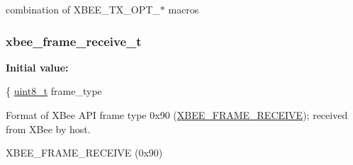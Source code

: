 combination of X\-B\-E\-E\-\_\-\-T\-X\-\_\-\-O\-P\-T\-\_\-$\ast$ macros \hypertarget{group__xbee__wpan_ga0d1e37574952bdf60cda7f1351b41a9e}{
\subsubsection[{xbee\-\_\-frame\-\_\-receive\-\_\-t}]{\setlength{\rightskip}{0pt plus 5cm}xbee\-\_\-frame\-\_\-receive\-\_\-t}}\label{group__xbee__wpan_ga0d1e37574952bdf60cda7f1351b41a9e}
{\bfseries Initial value\-:}
\begin{DoxyCode}
\{
   \hyperlink{group__hal_gae1affc9ca37cfb624959c866a73f83c2}{uint8\_t}       frame\_type
\end{DoxyCode}


Format of X\-Bee A\-P\-I frame type 0x90 (\hyperlink{group__xbee__device_gga7753bbebaf00d6d64942f64b6ae9b7b9ab6fa3650abecfac4645c5d4ccdf857fd}{X\-B\-E\-E\-\_\-\-F\-R\-A\-M\-E\-\_\-\-R\-E\-C\-E\-I\-V\-E}); received from X\-Bee by host. 

X\-B\-E\-E\-\_\-\-F\-R\-A\-M\-E\-\_\-\-R\-E\-C\-E\-I\-V\-E (0x90) 